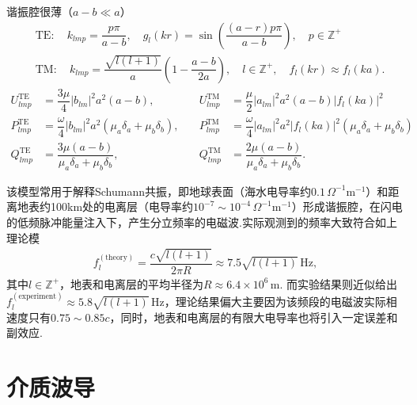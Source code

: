 \begin{exbox}
	谐振腔很薄（\(a - b \ll a\)）
	\begin{equation*}
		\begin{aligned}
			 & \text{TE}:\quad k_{lmp} = \dfrac{p\pi}{a - b},\quad g_l(kr) = \sin\left( \dfrac{(a - r)p\pi}{a - b} \right),\quad p \in \mathbb{Z}^+          \\
			 & \text{TM}:\quad k_{lmp} = \dfrac{\sqrt{l(l+1)}}{a} \left( 1 - \dfrac{a - b}{2a} \right),\quad l\in \mathbb{Z^+},\quad f_l(kr)\approx f_l(ka).
		\end{aligned}
	\end{equation*}
	\begin{equation*}
		\begin{aligned}
			U_{lmp}^{\text{TE}} & = \dfrac{3\mu}{4} |b_{lm}|^2 a^2 (a - b),\quad                             & U_{lmp}^{\text{TM}} & = \dfrac{\mu}{2} |a_{lm}|^2 a^2 (a - b) |f_l(ka)|^2                              \\
			P_{lmp}^{\text{TE}} & = \dfrac{\omega}{4} |b_{lm}|^2 a^2 (\mu_a \delta_a + \mu_b \delta_b),\quad & P_{lmp}^{\text{TM}} & = \dfrac{\omega}{4} |a_{lm}|^2 a^2 |f_l(ka)|^2 (\mu_a \delta_a + \mu_b \delta_b) \\
			Q_{lmp}^{\text{TE}} & = \dfrac{3\mu (a - b)}{\mu_a \delta_a + \mu_b \delta_b},\quad              & Q_{lmp}^{\text{TM}} & = \dfrac{2\mu (a - b)}{\mu_a \delta_a + \mu_b \delta_b}.
		\end{aligned}
	\end{equation*}

	该模型常用于解释Schumann共振，即地球表面（海水电导率约\(0.1 \, \Omega^{-1}\text{m}^{-1}\)）和距离地表约100km处的电离层（电导率约\(10^{-7} \sim 10^{-4} \, \Omega^{-1}\text{m}^{-1}\)）形成谐振腔，在闪电的低频脉冲能量注入下，产生分立频率的电磁波.实际观测到的频率大致符合如上理论模
	\begin{align*}
		f_l^{(\text{theory})} = \dfrac{c \sqrt{l(l+1)}}{2\pi R} \approx 7.5 \sqrt{l(l+1)} \, \text{Hz},
	\end{align*}
	其中\(l \in \mathbb{Z}^+\)，地表和电离层的平均半径为\(R \approx 6.4 \times 10^6 \, \text{m}\).
	而实验结果则近似给出\(f_l^{(\text{experiment})} \approx 5.8 \sqrt{l(l+1)} \, \text{Hz}\)，理论结果偏大主要因为该频段的电磁波实际相速度只有\(0.75 \sim 0.85c\)，同时，地表和电离层的有限大电导率也将引入一定误差和副效应.
\end{exbox}

\section{介质波导}
